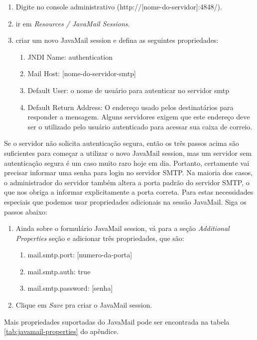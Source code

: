 \documentclass[envcountsame,envcountchap]{svmono}
\begin{document}
\begin{enumerate}
\item Digite no console administrativo (http://[nome-do-servidor]:4848/).
\item ir em \textit{Resources / JavaMail Sessions}.
\item criar um novo JavaMail session e defina as seguintes propriedades:
   \begin{enumerate}
   \item JNDI Name: authentication
   \item Mail Host: [nome-do-servidor-smtp]
   \item Default User: o nome de usuário para autenticar no servidor smtp
   \item Default Return Address: O endereço usado pelos destinatários para responder a mensagem. Alguns servidores exigem que este endereço deve ser o utilizado pelo usuário autenticado para acessar sua caixa de correio.
   \end{enumerate}
\end{enumerate}
 
Se o servidor não solicita autenticação segura, então os três passos acima são suficientes para começar a utilizar o novo JavaMail session, mas um servidor sem autenticação segura é um caso muito raro hoje em dia. Portanto, certamente vai precisar informar uma senha para login no servidor SMTP. Na maioria dos casos, o administrador do servidor também altera a porta padrão do servidor SMTP, o que nos obriga a informar explicitamente a porta correta. Para estas necessidades especiais que podemos usar propriedades adicionais na sessão JavaMail. Siga os passos abaixo:

\begin{enumerate}
\item Ainda sobre o formulário JavaMail session, vá para a seção \textit{Additional Properties} seção e adicionar três propriedades, que são:
   \begin{enumerate}
   \item mail.smtp.port: [numero-da-porta]
   \item mail.smtp.auth: true
   \item mail.smtp.password: [senha]
   \end{enumerate}
\item Clique em \textit{Save} pra criar o JavaMail session.
\end{enumerate}

Mais propriedades suportadas do JavaMail pode ser encontrada na tabela \ref{tab:javamail-properties} do apêndice.
\end{document}
